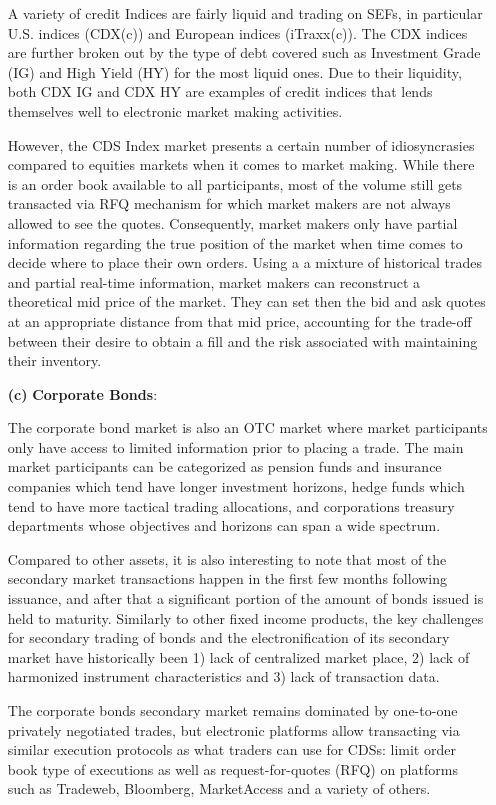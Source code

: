 \begin{enumerate}
A variety of credit Indices are fairly liquid and trading on SEFs, in particular U.S. indices (CDX(c)) and European indices (iTraxx(c)). The CDX indices are further broken out by the type of debt covered such as Investment Grade (IG) and High Yield (HY) for the most liquid ones. Due to their liquidity, both CDX IG and CDX HY are examples of credit indices that lends themselves well to electronic market making activities.


However, the CDS Index market presents a certain number of idiosyncrasies compared to equities markets when it comes to market making. While there is an order book available to all participants, most of the volume still gets transacted via RFQ mechanism for which market makers are not always allowed to see the quotes. Consequently, market makers only have partial information regarding the true position of the market when time comes to decide where to place their own orders. Using a a mixture of historical trades and partial real-time information, market makers can reconstruct a theoretical mid price of the market. They can set then the bid and ask quotes at an appropriate distance from that mid price, accounting for the trade-off between their desire to obtain a fill and the risk associated with maintaining their inventory. 


\item[\textbf{(c)}] \textbf{Corporate Bonds}: 

The corporate bond market is also an OTC market where market participants only have access to limited information prior to placing a trade. The main market participants can be categorized as pension funds and insurance companies which tend have longer investment horizons, hedge funds which tend to have more tactical trading allocations, and corporations treasury departments whose objectives and horizons can span a wide spectrum.


Compared to other assets, it is also interesting to note that most of the secondary market transactions happen in the first few months following issuance, and after that a significant portion of the amount of bonds issued is held to maturity. Similarly to other fixed income products, the key challenges for secondary trading of bonds and the electronification of its secondary market have historically been 1) lack of centralized market place, 2) lack of harmonized instrument characteristics and 3) lack of transaction data.


The corporate bonds secondary market remains dominated by one-to-one privately negotiated trades, but electronic platforms allow transacting via similar execution protocols as what traders can use for CDSs: limit order book type of executions as well as request-for-quotes (RFQ) on platforms such as Tradeweb, Bloomberg, MarketAccess and a variety of others.



\end{enumerate}
